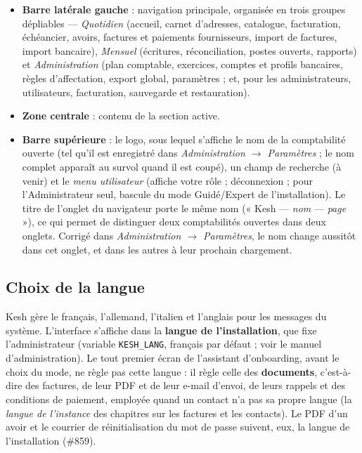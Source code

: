 \documentclass[a4paper,11pt,oneside]{article}
\begin{document}
\begin{itemize}
    \item \textbf{Barre latérale gauche} : navigation principale, organisée en trois
    groupes dépliables — \emph{Quotidien} (accueil, carnet d'adresses, catalogue,
    facturation, échéancier, avoirs, factures et paiements fournisseurs, import de
    factures, import bancaire), \emph{Mensuel} (écritures, réconciliation, postes ouverts, rapports)
    et \emph{Administration} (plan comptable, exercices, comptes et profils
    bancaires, règles d'affectation, export global, paramètres ; et, pour les
    administrateurs, utilisateurs, facturation, sauvegarde et restauration).
    \item \textbf{Zone centrale} : contenu de la section active.
    \item \textbf{Barre supérieure} : le logo, sous lequel s'affiche le nom de la
    comptabilité ouverte (tel qu'il est enregistré dans
    \emph{Administration $\rightarrow$ Paramètres} ; le nom complet apparaît au
    survol quand il est coupé), un champ de recherche (à venir) et le
    \emph{menu utilisateur} (affiche votre rôle ; déconnexion ; pour
    l'Administrateur seul, bascule du mode Guidé/Expert de l'installation). Le titre de l'onglet du navigateur porte le même nom
    (« Kesh --- \emph{nom} --- \emph{page} »), ce qui permet de distinguer deux
    comptabilités ouvertes dans deux onglets. Corrigé dans \emph{Administration
    $\rightarrow$ Paramètres}, le nom change aussitôt dans cet onglet, et dans les
    autres à leur prochain chargement.
\end{itemize}

\subsection{Choix de la langue}

Kesh gère le français, l'allemand, l'italien et l'anglais pour les messages du
système. L'interface s'affiche dans la \textbf{langue de l'installation}, que
fixe l'administrateur (variable \texttt{KESH\_LANG}, français par défaut ; voir
le manuel d'administration). Le tout premier écran de l'assistant d'onboarding,
avant le choix du mode, ne règle pas cette langue : il règle celle des
\textbf{documents}, c'est-à-dire des factures, de leur PDF et de leur e-mail
d'envoi, de leurs rappels et des conditions de paiement, employée quand un
contact n'a pas sa propre langue (la \emph{langue de l'instance} des chapitres
sur les factures et les contacts). Le PDF d'un avoir et le courrier de
réinitialisation du mot de passe suivent, eux, la langue de l'installation
(\#859).
\end{document}
